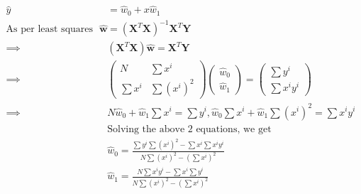 \documentclass[12pt, letterpaper]{article}
\begin{document}
\begin{align*}
  \hat{y} &= \hat{w}_0 + x\hat{w}_1 \\
  \text{As per least squares method, } \mathbf{\hat{w}} &= (\mathbf{X}^T\mathbf{X})^{-1}\mathbf{X}^T\mathbf{Y} \\
  \implies &(\mathbf{X}^T\mathbf{X})\mathbf{\hat{w}} = \mathbf{X}^T\mathbf{Y} \\
  \implies &\begin{pmatrix} N & \sum{x^i} \\ \sum{x^i} & \sum{(x^i)^2} \end{pmatrix}
           \begin{pmatrix} \hat{w}_0 \\ \hat{w}_1 \end{pmatrix} =
           \begin{pmatrix} \sum{y^i} \\ \sum{x^iy^i}\end{pmatrix} \\
  \implies &N\hat{w}_0 + \hat{w}_1\sum{x^i} = \sum{y^i}, \hat{w}_0\sum{x^i} + \hat{w}_1\sum{(x^i)^2} = \sum{x^iy^i} \\
  &\text{Solving the above 2 equations, we get}\\
  &\hat{w}_0 = \frac{\sum{y^i}\sum{(x^i)^2} - \sum{x^i}\sum{x^iy^i}}{N\sum{(x^i)^2} - (\sum{x^i})^2} \\
  &\hat{w}_1 = \frac{N\sum{x^iy^i} - \sum{x^i}\sum{y^i}}{N\sum{(x^i)^2} - (\sum{x^i})^2} \\
\end{align*}
\end{document}
